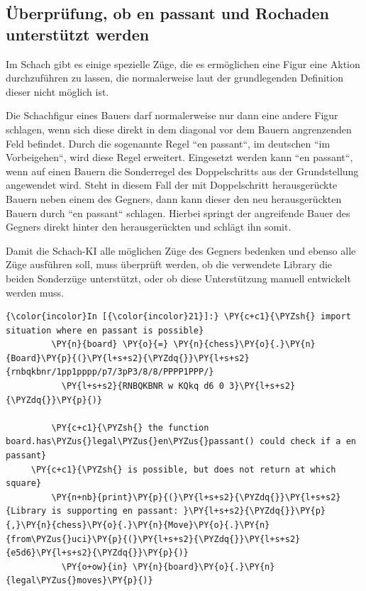     \subsection{Überprüfung, ob en passant und Rochaden unterstützt
werden}\label{uxfcberpruxfcfung-ob-en-passant-und-rochaden-unterstuxfctzt-werden}

Im Schach gibt es einige spezielle Züge, die es ermöglichen eine Figur
eine Aktion durchzuführen zu lassen, die normalerweise laut der
grundlegenden Definition dieser nicht möglich ist.

Die Schachfigur eines Bauers darf normalerweise nur dann eine andere
Figur schlagen, wenn sich diese direkt in dem diagonal vor dem Bauern
angrenzenden Feld befindet. Durch die sogenannte Regel ``en passant``, im
deutschen ``im Vorbeigehen``, wird diese Regel erweitert. Eingesetzt
werden kann ``en passant``, wenn auf einen Bauern die Sonderregel des
Doppelschritts aus der Grundstellung angewendet wird. Steht in diesem
Fall der mit Doppelschritt herausgerückte Bauern neben einem des
Gegners, dann kann dieser den neu herausgerückten Bauern durch ``en
passant`` schlagen. Hierbei springt der angreifende Bauer des Gegners
direkt hinter den herausgerückten und schlägt ihn somit.

Damit die Schach-KI alle möglichen Züge des Gegners bedenken und ebenso
alle Züge ausführen soll, muss überprüft werden, ob die verwendete
Library die beiden Sonderzüge unterstützt, oder ob diese Unterstützung
manuell entwickelt werden muss.

    \begin{Verbatim}[commandchars=\\\{\}]
{\color{incolor}In [{\color{incolor}21}]:} \PY{c+c1}{\PYZsh{} import situation where en passant is possible}
         \PY{n}{board} \PY{o}{=} \PY{n}{chess}\PY{o}{.}\PY{n}{Board}\PY{p}{(}\PY{l+s+s2}{\PYZdq{}}\PY{l+s+s2}{rnbqkbnr/1pp1pppp/p7/3pP3/8/8/PPPP1PPP/}
		   \PY{l+s+s2}{RNBQKBNR w KQkq d6 0 3}\PY{l+s+s2}{\PYZdq{}}\PY{p}{)}
         
         \PY{c+c1}{\PYZsh{} the function board.has\PYZus{}legal\PYZus{}en\PYZus{}passant() could check if a en passant}
	 \PY{c+c1}{\PYZsh{} is possible, but does not return at which square}
         \PY{n+nb}{print}\PY{p}{(}\PY{l+s+s2}{\PYZdq{}}\PY{l+s+s2}{Library is supporting en passant: }\PY{l+s+s2}{\PYZdq{}}\PY{p}{,}\PY{n}{chess}\PY{o}{.}\PY{n}{Move}\PY{o}{.}\PY{n}{from\PYZus{}uci}\PY{p}{(}\PY{l+s+s2}{\PYZdq{}}\PY{l+s+s2}{e5d6}\PY{l+s+s2}{\PYZdq{}}\PY{p}{)} 
		   \PY{o+ow}{in} \PY{n}{board}\PY{o}{.}\PY{n}{legal\PYZus{}moves}\PY{p}{)}
\end{Verbatim}


